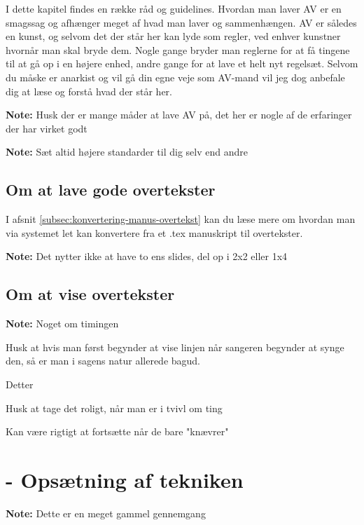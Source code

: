 \documentclass[10pt,a4paper,danish]{article}
\newcommand{\note}[1]{\begin{mdframed}[style=note]\textbf{Note:}
    #1\end{mdframed}}
\begin{document}
I dette kapitel findes en række råd og guidelines. Hvordan man laver AV er en
smagssag og afhænger meget af hvad man laver og sammenhængen. AV er således en
kunst, og selvom det der står her kan lyde som regler, ved enhver kunstner
hvornår man skal bryde dem. Nogle gange bryder man reglerne for at få tingene
til at gå op i en højere enhed, andre gange for at lave et helt nyt regelsæt.
Selvom du måske er anarkist og vil gå din egne veje som AV-mand vil jeg dog
anbefale dig at læse og forstå hvad der står her.

\note{Husk der er mange måder at lave AV på, det her er nogle af de erfaringer
  der har virket godt}

\note{Sæt altid højere standarder til dig selv end andre}

\subsection{Om at lave gode overtekster}




I afsnit \ref{subsec:konvertering-manus-overtekst} kan du læse mere om hvordan
man via systemet let kan konvertere fra et .tex manuskript til overtekster.



\note{Det nytter ikke at have to ens slides, del op i 2x2 eller 1x4}
\subsection{Om at vise overtekster}
\note{Noget om timingen}


Husk at hvis man først begynder at vise linjen når sangeren begynder at synge
den, så er man i sagens natur allerede bagud.

Detter

Husk at tage det roligt, når man er i tvivl om ting


Kan være rigtigt at fortsætte når de bare "knævrer"

\newpage
\section{- Opsætning af tekniken}
\note{Dette er en meget gammel gennemgang}
\end{document}
